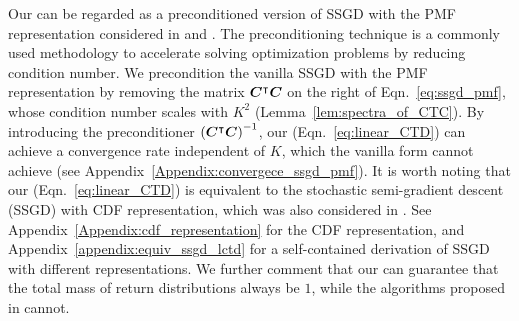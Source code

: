 \begin{remark}
Our {\LCTD} can be regarded as a preconditioned version of SSGD with the PMF representation considered in \citep{bellemare2019distributional} and \citep[Section~9.6][]{bdr2022}.
The preconditioning technique \citep{chen2005matrix, li2017preconditioned} is a commonly used methodology to accelerate solving optimization problems by reducing condition number.
We precondition the vanilla SSGD with the PMF representation by removing the matrix ${\bm{C}}^{\intercal}{\bm{C}}$ on the right of Eqn.~\eqref{eq:ssgd_pmf}, whose condition number scales with $K^2$ (Lemma~\ref{lem:spectra_of_CTC}).
By introducing the preconditioner $\left({{\bm{C}}^{\intercal}{\bm{C}}}\right)^{-1}$, our {\LCTD} (Eqn.~\eqref{eq:linear_CTD}) can achieve a convergence rate independent of $K$, which the vanilla form cannot achieve (see Appendix~\ref{Appendix:convergece_ssgd_pmf}).
It is worth noting that our {\LCTD} (Eqn.~\eqref{eq:linear_CTD}) is equivalent to the stochastic semi-gradient descent (SSGD) with CDF representation, which was also considered in \citep{lyle2019comparative}.
See Appendix~\ref{Appendix:cdf_representation} for the CDF representation, and Appendix~\ref{appendix:equiv_ssgd_lctd} for a self-contained derivation of SSGD with different representations.
We further comment that our {\LCTD} can guarantee that the total mass of return distributions always be $1$, while the algorithms proposed in \citep{lyle2019comparative} cannot.
\end{remark}

